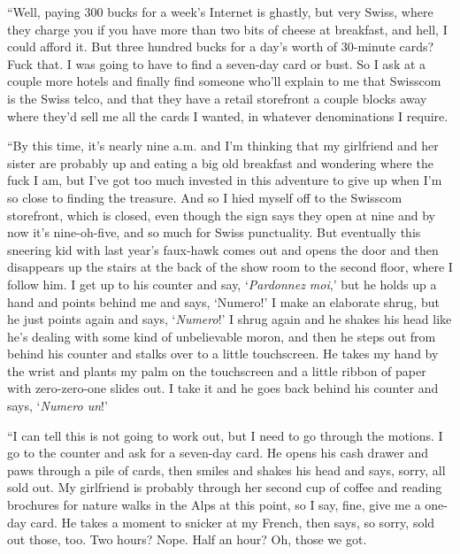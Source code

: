\documentclass{article}
\begin{document}
``Well, paying 300 bucks for a week's Internet is ghastly, but very
Swiss, where they charge you if you have more than two bits of cheese
at breakfast, and hell, I could afford it.  But three hundred bucks
for a day's worth of 30-minute cards?  Fuck that.  I was going to have
to find a seven-day card or bust.  So I ask at a couple more hotels
and finally find someone who'll explain to me that Swisscom is the
Swiss telco, and that they have a retail storefront a couple blocks
away where they'd sell me all the cards I wanted, in whatever
denominations I require.

``By this time, it's nearly nine a.m.  and I'm thinking that my
girlfriend and her sister are probably up and eating a big old
breakfast and wondering where the fuck I am, but I've got too much
invested in this adventure to give up when I'm so close to finding the
treasure.  And so I hied myself off to the Swisscom storefront, which
is closed, even though the sign says they open at nine and by now it's
nine-oh-five, and so much for Swiss punctuality.  But eventually this
sneering kid with last year's faux-hawk comes out and opens the door
and then disappears up the stairs at the back of the show room to the
second floor, where I follow him.  I get up to his counter and say,
`\textit{Pardonnez moi},' but he holds up a hand and points behind me
and says, `Numero!' I make an elaborate shrug, but he just points
again and says, `\textit{Numero}!' I shrug again and he shakes his
head like he's dealing with some kind of unbelievable moron, and then
he steps out from behind his counter and stalks over to a little
touchscreen.  He takes my hand by the wrist and plants my palm on the
touchscreen and a little ribbon of paper with zero-zero-one slides
out.  I take it and he goes back behind his counter and says,
`\textit{Numero un}!'

``I can tell this is not going to work out, but I need to go through
the motions.  I go to the counter and ask for a seven-day card.  He
opens his cash drawer and paws through a pile of cards, then smiles
and shakes his head and says, sorry, all sold out.  My girlfriend is
probably through her second cup of coffee and reading brochures for
nature walks in the Alps at this point, so I say, fine, give me a
one-day card.  He takes a moment to snicker at my French, then says,
so sorry, sold out those, too.  Two hours?  Nope.  Half an hour?  Oh,
those we got.
\end{document}
